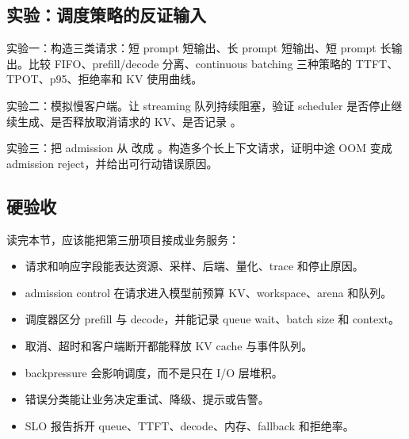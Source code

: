 \subsection{实验：调度策略的反证输入}

\begin{exercisebox}
实验一：构造三类请求：短 prompt 短输出、长 prompt 短输出、短 prompt 长输出。比较 FIFO、prefill/decode 分离、continuous batching 三种策略的 TTFT、TPOT、p95、拒绝率和 KV 使用曲线。

实验二：模拟慢客户端。让 streaming 队列持续阻塞，验证 scheduler 是否停止继续生成、是否释放取消请求的 KV、是否记录 。

实验三：把 admission 从  改成 。构造多个长上下文请求，证明中途 OOM 变成 admission reject，并给出可行动错误原因。
\end{exercisebox}

\subsection{硬验收}

读完本节，应该能把第三册项目接成业务服务：

\begin{itemize}
  \item 请求和响应字段能表达资源、采样、后端、量化、trace 和停止原因。
  \item admission control 在请求进入模型前预算 KV、workspace、arena 和队列。
  \item 调度器区分 prefill 与 decode，并能记录 queue wait、batch size 和 context。
  \item 取消、超时和客户端断开都能释放 KV cache 与事件队列。
  \item backpressure 会影响调度，而不是只在 I/O 层堆积。
  \item 错误分类能让业务决定重试、降级、提示或告警。
  \item SLO 报告拆开 queue、TTFT、decode、内存、fallback 和拒绝率。
\end{itemize}
